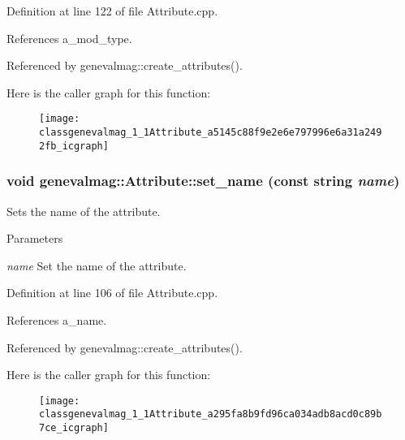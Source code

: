 Definition at line 122 of file Attribute.cpp.



References a\_\-mod\_\-type.



Referenced by genevalmag::create\_\-attributes().



Here is the caller graph for this function:\nopagebreak
\begin{figure}[H]
\begin{center}
\leavevmode
\texttt{[image: classgenevalmag\_1\_1Attribute\_a5145c88f9e2e6e797996e6a31a2492fb\_icgraph]}
\end{center}
\end{figure}


\hypertarget{classgenevalmag_1_1Attribute_a295fa8b9fd96ca034adb8acd0c89b7ce}{
\subsubsection[{set\_\-name}]{\setlength{\rightskip}{0pt plus 5cm}void genevalmag::Attribute::set\_\-name (const string {\em name})}}
\label{classgenevalmag_1_1Attribute_a295fa8b9fd96ca034adb8acd0c89b7ce}
Sets the name of the attribute. 
\begin{DoxyParams}{Parameters}
\item[{\em name}]Set the name of the attribute. \end{DoxyParams}


Definition at line 106 of file Attribute.cpp.



References a\_\-name.



Referenced by genevalmag::create\_\-attributes().



Here is the caller graph for this function:\nopagebreak
\begin{figure}[H]
\begin{center}
\leavevmode
\texttt{[image: classgenevalmag\_1\_1Attribute\_a295fa8b9fd96ca034adb8acd0c89b7ce\_icgraph]}
\end{center}
\end{figure}


